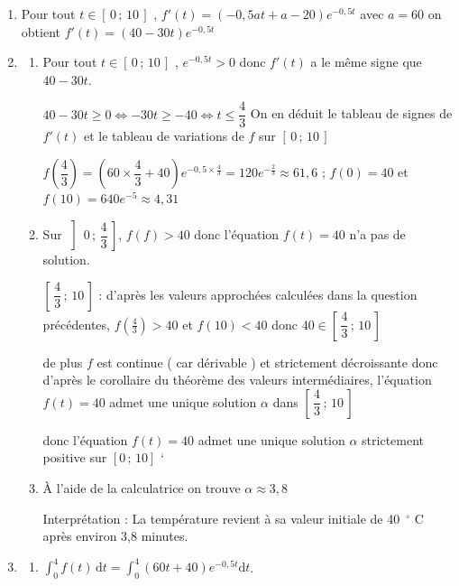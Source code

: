 \begin{enumerate}
\item Pour tout $t\in [\,0\,;\,10\,]$ , $ f'(t) =\left(-0{,}5 a t + a - 20\right) e^{-0{,}5t}$ avec $a=60$ on obtient $ f'(t) =(40 - 30 t) e^{-0{,}5 t}$

\item 
	\begin{enumerate}
		\item Pour tout $t\in [\,0\,;\,10\,]$ , $e^{-0{,}5t}>0$ donc $f'(t)$ a le même signe que $40 - 30t$.  

$40-30t \geqslant 0 \iff -30t \geqslant -40 \iff t \leqslant  \dfrac{4}{3}$ On en déduit le tableau de signes de $f'(t)$ et le tableau de variations de $f$ sur  $ [\,0\,;\,10\,]$ 


$f\left(\dfrac{4}{3}\right) =  \left(60 \times \dfrac{4}{3} + 40\right) e^{-0,5 \times \frac{4}{3}} = 120e^{-\frac{2}{3}}\approx 61,6$ ; $f(0)=40$ et $f(10)= 640 e^{-5} \approx 4,31 $

\item Sur $\left]\,0\,;\,\dfrac{4}{3}\,\right]$, $f(f)>40$ donc l'équation  $f(t) = 40$ n'a pas de solution. 

$\left[\,\dfrac{4}{3}\,;\,10\,\right]$ : d'après les valeurs approchées calculées dans la question précédentes, $f(\frac{4}{3}) > 40$ et $f(10) < 40$ donc $40 \in \left[\,\dfrac{4}{3}\,;\,10\,\right]$

de plus $f$ est continue ( car dérivable ) et strictement décroissante donc d'après le corollaire du théorème des valeurs intermédiaires, l'équation $f(t) = 40$ admet une unique solution $\alpha$ dans $\left[\,\dfrac{4}{3}\,;\,10\,\right]$

donc l'équation $f(t) = 40$ admet une unique solution $\alpha$
strictement positive sur $[0\,; \,10]$
`
\item À l'aide de la calculatrice on trouve $\alpha \approx 3,8$

Interprétation : La température revient à sa valeur initiale de 40~\ensuremath{^\circ} C après environ 3,8 minutes.
\end{enumerate}

\item
	\begin{enumerate}
		\item $\displaystyle \int_0^4 f(t)\,\text{d}t =\displaystyle  \int_0^4 (60 t + 40) e^{-0{,}5t} \text{d}t$.


\end{enumerate}
\end{enumerate}
